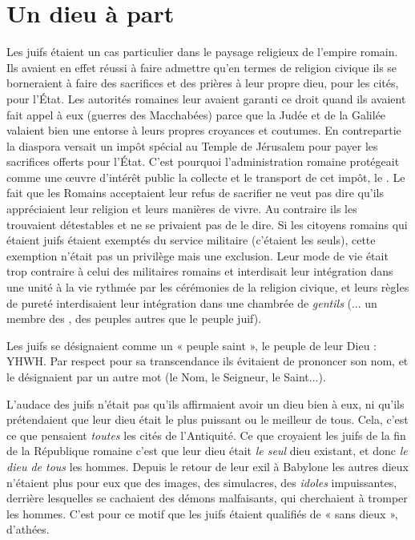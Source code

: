 \section{Un dieu à part}

 Les juifs étaient un cas particulier dans le paysage religieux de l'empire romain. Ils avaient en effet réussi à faire admettre qu'en termes de religion civique ils se borneraient à faire des sacrifices et des prières à leur propre dieu, pour les cités, pour l'État. Les autorités romaines leur avaient garanti ce droit quand ils avaient fait appel à eux (guerres des Macchabées) parce que la Judée et de la Galilée valaient bien une entorse à leurs propres croyances et coutumes. En contrepartie la diaspora versait un impôt spécial au Temple de Jérusalem pour payer les sacrifices offerts pour l'État. C'est pourquoi l'administration romaine protégeait comme une œuvre d'intérêt public la collecte et le transport de cet impôt, le . Le fait que les Romains acceptaient leur refus de sacrifier ne veut pas dire qu'ils appréciaient leur religion et leurs manières de vivre. Au contraire ils les trouvaient détestables et ne se privaient pas de le dire. Si les citoyens romains qui étaient juifs étaient exemptés du service militaire (c'étaient les seuls), cette exemption n'était pas un privilège mais une exclusion. Leur mode de vie était trop contraire à celui des militaires romains et interdisait leur intégration dans une unité à la vie rythmée par les cérémonies de la religion civique, et leurs règles de pureté interdisaient leur intégration dans une chambrée de \emph{gentils} (... un membre des , des peuples autres que le peuple juif). 

 Les juifs se désignaient comme un « peuple saint », le peuple de leur Dieu : YHWH. Par respect pour sa transcendance ils évitaient de prononcer son nom, et le désignaient par un autre mot (le Nom, le Seigneur, le Saint...). 

 L'audace des juifs n'était pas qu'ils affirmaient avoir un dieu bien à eux, ni qu'ils prétendaient que leur dieu était le plus puissant ou le meilleur de tous. Cela, c'est ce que pensaient \emph{toutes} les cités de l'Antiquité. Ce que croyaient les juifs de la fin de la République romaine c'est que leur dieu était \emph{le seul} dieu existant, et donc \emph{le dieu de tous} les hommes. Depuis le retour de leur exil à Babylone les autres dieux n'étaient plus pour eux que des images, des simulacres, des \emph{idoles} impuissantes, derrière lesquelles se cachaient des démons malfaisants, qui cherchaient à tromper les hommes. C'est pour ce motif que les juifs étaient qualifiés de « {sans dieux} », d'athées. 


